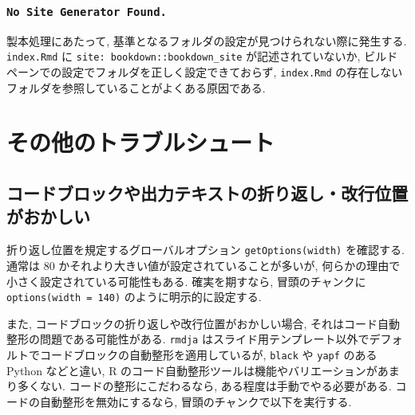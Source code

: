 \documentclass[
]{bxjsbook}
\newenvironment{Shaded}{\begin{snugshade}}{\end{snugshade}}
\newcommand{\AttributeTok}[1]{\textcolor[rgb]{0.77,0.63,0.00}{#1}}
\newcommand{\FunctionTok}[1]{\textcolor[rgb]{0.00,0.00,0.00}{#1}}
\newcommand{\NormalTok}[1]{#1}
\newcommand{\SpecialCharTok}[1]{\textcolor[rgb]{0.00,0.00,0.00}{#1}}
\theoremstyle{definition}
\theoremstyle{definition}
\theoremstyle{definition}
\theoremstyle{remark}
\begin{document}
\hypertarget{no-site-generator-found.}{%
\subsection{\texorpdfstring{\texttt{No\ Site\ Generator\ Found.}}{No Site Generator Found.}}\label{no-site-generator-found.}}

製本処理にあたって,
基準となるフォルダの設定が見つけられない際に発生する. \texttt{index.Rmd}
に \texttt{site:\ bookdown::bookdown\_site} が記述されていないか,
ビルドペーンでの設定でフォルダを正しく設定できておらず,
\texttt{index.Rmd}
の存在しないフォルダを参照していることがよくある原因である.

\hypertarget{ux305dux306eux4ed6ux306eux30c8ux30e9ux30d6ux30ebux30b7ux30e5ux30fcux30c8}{%
\chapter{その他のトラブルシュート}\label{ux305dux306eux4ed6ux306eux30c8ux30e9ux30d6ux30ebux30b7ux30e5ux30fcux30c8}}

\hypertarget{ux30b3ux30fcux30c9ux30d6ux30edux30c3ux30afux3084ux51faux529bux30c6ux30adux30b9ux30c8ux306eux6298ux308aux8fd4ux3057ux6539ux884cux4f4dux7f6eux304cux304aux304bux3057ux3044}{%
\section{コードブロックや出力テキストの折り返し・改行位置がおかしい}\label{ux30b3ux30fcux30c9ux30d6ux30edux30c3ux30afux3084ux51faux529bux30c6ux30adux30b9ux30c8ux306eux6298ux308aux8fd4ux3057ux6539ux884cux4f4dux7f6eux304cux304aux304bux3057ux3044}}

折り返し位置を規定するグローバルオプション \texttt{getOptions(width)}
を確認する. 通常は 80 かそれより大きい値が設定されていることが多いが,
何らかの理由で小さく設定されている可能性もある. 確実を期すなら,
冒頭のチャンクに \texttt{options(width\ =\ 140)}
のように明示的に設定する.

また, コードブロックの折り返しや改行位置がおかしい場合,
それはコード自動整形の問題である可能性がある. \texttt{rmdja}
はスライド用テンプレート以外でデフォルトでコードブロックの自動整形を適用しているが,
\texttt{black} や \texttt{yapf} のある Python などと違い, R
のコード自動整形ツールは機能やバリエーションがあまり多くない.
コードの整形にこだわるなら, ある程度は手動でやる必要がある.
コードの自動整形を無効にするなら, 冒頭のチャンクで以下を実行する.

\begin{Shaded}
\end{Shaded}
\end{document}
